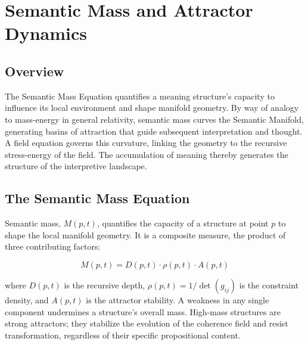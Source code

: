 \chapter{Semantic Mass and Attractor Dynamics}
\label{ch:semantic_mass_and_attractor_dynamics}


\section{Overview}

The Semantic Mass Equation quantifies a meaning structure's capacity to influence its local environment and shape manifold geometry. By way of analogy to mass-energy in general relativity, semantic mass curves the Semantic Manifold, generating basins of attraction that guide subsequent interpretation and thought. A field equation governs this curvature, linking the geometry to the recursive stress-energy of the field. The accumulation of meaning thereby generates the structure of the interpretive landscape.


\section{The Semantic Mass Equation}
\label{sec:the_semantic_mass_equation}

Semantic mass, \(M(p,t)\), quantifies the capacity of a structure at point \(p\) to shape the local manifold geometry. It is a composite measure, the product of three contributing factors:

\begin{equation}
M(p, t) = D(p, t) \cdot \rho(p, t) \cdot A(p, t)
\end{equation}

where \(D(p, t)\) is the recursive depth, \(\rho(p, t) = 1/\det(g_{ij})\) is the constraint density, and \(A(p, t)\) is the attractor stability. A weakness in any single component undermines a structure's overall mass. High-mass structures are strong attractors; they stabilize the evolution of the coherence field and resist transformation, regardless of their specific propositional content.


